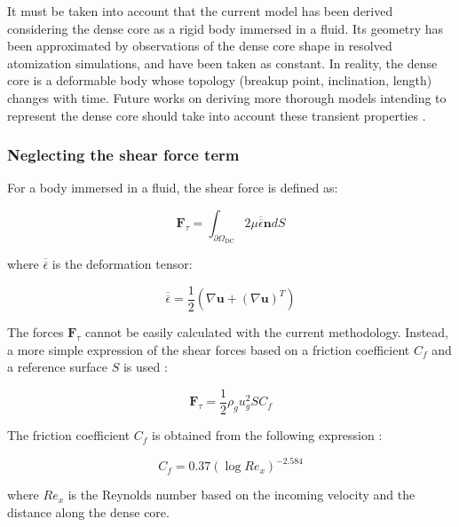 It must be taken into account that the current model has been derived considering the dense core as a rigid body immersed in a fluid. Its geometry has been approximated by observations of the dense core shape in resolved atomization simulations, and have been taken as constant. In reality, the dense core is a deformable body whose topology (breakup point, inclination, length) changes with time. Future works on deriving more thorough models intending to represent the dense core should take into account these transient properties .

\subsubsection*{Neglecting the shear force term}

For a body immersed in a fluid, the shear force is defined as:

\begin{equation}
\boldsymbol{F}_\tau = \int_{\partial \Omega_\mathrm{DC}} 2 \mu \overline{\overline{\epsilon}} \boldsymbol{n} dS
\end{equation}

where $\overline{\overline{\epsilon}}$ is the deformation tensor:

\begin{equation}
\overline{\overline{\epsilon}} = \frac{1}{2} \left( \nabla \boldsymbol{u} + \left(\nabla \boldsymbol{u}\right)^T \right)
\end{equation}

The forces $\boldsymbol{F}_\tau$ cannot be easily calculated with the current methodology. Instead, a more simple expression of the shear forces based on a friction coefficient $C_f$ and a reference surface $S$ is used :

\begin{equation}
\label{eq:ALM_model_Ftau}
\boldsymbol{F}_\tau = \frac{1}{2} \rho_g u_g^2 S C_f 
\end{equation}

The friction coefficient $C_f$ is obtained from the following expression :

\begin{equation}
\label{eq:ALM_model_Cf}
C_f = 0.37 \left( \log Re_x \right)^{-2.584}
\end{equation}

where $Re_x$ is the Reynolds number based on the incoming velocity and the distance along the dense core.


